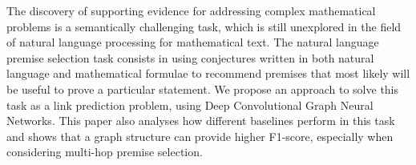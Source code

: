 The discovery of supporting evidence for addressing complex mathematical problems is a semantically challenging task, which is still unexplored in the field of natural language processing for mathematical text. The natural language premise selection task consists in using conjectures written in both natural language and mathematical formulae to recommend premises that most likely will be useful to prove a particular statement. We propose an approach to solve this task as a link prediction problem, using Deep Convolutional Graph Neural Networks. This paper also analyses how different baselines perform in this task and shows that a graph structure can provide higher F1-score, especially when considering multi-hop premise selection.
